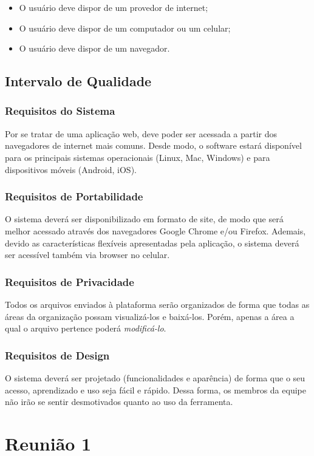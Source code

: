 \begin{apendicesenv}
\begin{itemize}
  \item O usuário deve dispor de um provedor de internet;
  \item O usuário deve dispor de um computador ou um celular;
  \item O usuário deve dispor de um navegador.
\end{itemize}

\section{Intervalo de Qualidade}
\subsection{Requisitos do Sistema}
Por se tratar de uma aplicação web, deve poder ser acessada a partir dos navegadores de internet mais comuns. Desde modo, o software estará disponível para os principais sistemas operacionais (Linux, Mac, Windows) e para dispositivos móveis (Android, iOS).

\subsection{Requisitos de Portabilidade}
O sistema deverá ser disponibilizado em formato de site, de modo que será melhor acessado através dos navegadores Google Chrome e/ou Firefox. Ademais, devido as características flexíveis apresentadas pela aplicação, o sistema deverá ser acessível também via browser no celular.

\subsection{Requisitos de Privacidade}
Todos os arquivos enviados à plataforma serão organizados de forma que todas as áreas da organização possam visualizá-los e baixá-los. Porém, apenas a área a qual o arquivo pertence poderá \textit{modificá-lo}.

\subsection{Requisitos de Design}
O sistema deverá ser projetado (funcionalidades e aparência) de forma que o seu acesso, aprendizado e uso seja fácil e rápido. Dessa forma, os membros da equipe não irão se sentir desmotivados quanto ao uso da ferramenta.


\chapter{Reunião 1}
\label{appendix:reuniao1}





\end{apendicesenv}

